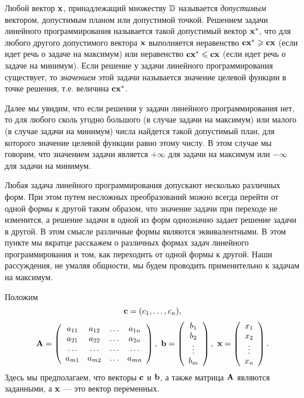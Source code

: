 Любой вектор $\mathbf{x}$, принадлежащий множеству $\mathbb{D}$ называется \emph{допустимым}
вектором, допустимым планом или допустимой точкой. Решением задачи линейного программирования
называется такой допустимый вектор $\mathbf{x^{*}}$, что для любого другого допустимого вектора
$\mathbf{x}$ выполняется неравенство $\mathbf{c}\mathbf{x^{*}}\geqslant\mathbf{c}\mathbf{x}$ (если идет речь о
задаче на максимум) или неравенство $\mathbf{c}\mathbf{x^{*}}\leqslant\mathbf{c}\mathbf{x}$ (если идет речь о
задаче на минимум). Если решение у задачи линейного программирования существует, то
\emph{значением} этой задачи называется значение целевой функции в точке решения, т.е.
величина $\mathbf{c}\mathbf{x^{*}}$.

Далее мы увидим, что если решения у задачи линейного программирования нет, то для любого
сколь угодно большого (в случае задачи на максимум) или малого  (в случае задачи на минимум)
числа найдется такой допустимый план, для которого значение целевой функции равно этому
числу. В этом случае мы говорим, что значением задачи является $+\infty$ для задачи на
максимум или $-\infty$ для задачи на минимум.

Любая задача линейного программирования допускают несколько
различных форм. При этом путем несложных преобразований можно всегда
перейти от одной формы к другой таким образом, что значение задачи
при переходе не изменится, а решение задачи в одной из форм
однозначно задает решение задачи в другой. В этом смысле различные
формы являются эквивалентными. В этом пункте мы вкратце расскажем о
различных формах задач линейного программирования и том, как
переходить от одной формы к другой. Наши рассуждения, не умаляя
общности, мы будем проводить применительно к задачам на максимум.

Положим
\[\mathbf{c}=(c_{1},\ldots,c_{n}),\]
\[\mathbf{A}=\left(
\begin{array}{cccc}
   a_{11} & a_{12} & \ldots & a_{1n} \\
   a_{21} & a_{22} & \ldots & a_{2n} \\
   \ldots& \ldots &\ldots &\ldots \\
   a_{m1} & a_{m2} & \ldots & a_{mn}
\end{array}
\right), \ \mathbf{b}=\left(
     \begin{array}{c}
        b_{1} \\
        b_{2} \\
        \vdots \\
        b_{m}  \\
      \end{array}
    \right),\ \mathbf{x}=\left(
     \begin{array}{c}
        x_{1} \\
        x_{2} \\
        \vdots \\
        x_{n}  \\
      \end{array}
    \right).\]
    Здесь мы предполагаем, что векторы $\mathbf{c}$ и $\mathbf{b}$, а также
    матрица $\mathbf{A}$ являются заданными, а $\mathbf{x}$ --- это вектор
    переменных.



